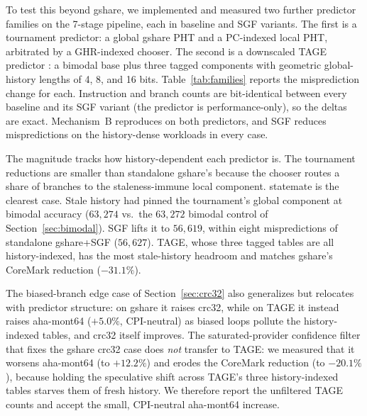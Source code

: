 \documentclass[acmsmall,nonacm,screen]{acmart}
\begin{document}
To test this beyond gshare, we implemented and measured two further predictor families on the 7-stage pipeline, each in baseline and SGF variants. The first is a tournament predictor: a global gshare PHT and a PC-indexed local PHT, arbitrated by a GHR-indexed chooser. The second is a downscaled TAGE predictor \cite{seznec2011tage}: a bimodal base plus three tagged components with geometric global-history lengths of 4, 8, and 16 bits. Table~\ref{tab:families} reports the misprediction change for each. Instruction and branch counts are bit-identical between every baseline and its SGF variant (the predictor is performance-only), so the deltas are exact. Mechanism~B reproduces on both predictors, and SGF reduces mispredictions on the history-dense workloads in every case.

The magnitude tracks how history-dependent each predictor is. The tournament reductions are smaller than standalone gshare's because the chooser routes a share of branches to the staleness-immune local component. statemate is the clearest case. Stale history had pinned the tournament's global component at bimodal accuracy ($63{,}274$ vs.\ the $63{,}272$ bimodal control of Section~\ref{sec:bimodal}). SGF lifts it to $56{,}619$, within eight mispredictions of standalone gshare+SGF ($56{,}627$). TAGE, whose three tagged tables are all history-indexed, has the most stale-history headroom and matches gshare's CoreMark reduction ($-31.1\%$).

The biased-branch edge case of Section~\ref{sec:crc32} also generalizes but relocates with predictor structure: on gshare it raises crc32, while on TAGE it instead raises aha-mont64 ($+5.0\%$, CPI-neutral) as biased loops pollute the history-indexed tables, and crc32 itself improves. The saturated-provider confidence filter that fixes the gshare crc32 case does \emph{not} transfer to TAGE: we measured that it worsens aha-mont64 (to $+12.2\%$) and erodes the CoreMark reduction (to $-20.1\%$), because holding the speculative shift across TAGE's three history-indexed tables starves them of fresh history. We therefore report the unfiltered TAGE counts and accept the small, CPI-neutral aha-mont64 increase.
\end{document}
